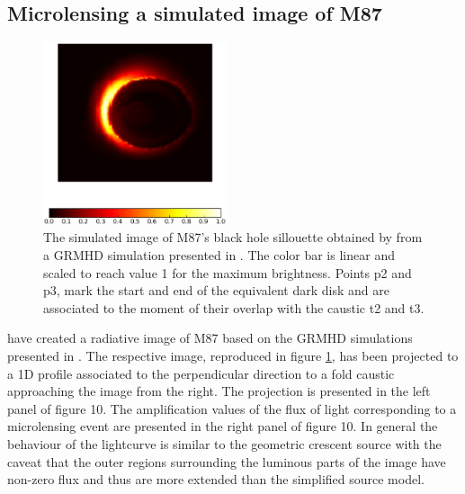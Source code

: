 \subsection{Microlensing a simulated image of M87}

\begin{figure}
\centering
        \includegraphics[width = 0.48\textwidth]{plots/M87_image.eps}
\caption{\label{fig:M87_image} The simulated image of M87's black hole sillouette obtained by \citep{2012MNRAS.421.1517D} from a GRMHD simulation presented in \citep{2009MNRAS.394L.126M}. The color bar is linear and scaled to reach value 1 for the maximum brightness. Points p2 and p3, mark the start and end of the equivalent dark disk and are associated to the moment of their overlap with the caustic t2 and t3.}
\end{figure}


\cite{2012MNRAS.421.1517D} have created a radiative image of M87 based on the GRMHD simulations presented in \citep{2009MNRAS.394L.126M}. The respective image, reproduced in figure \ref{fig:M87_image}, has been projected to a 1D profile associated to the perpendicular direction to a fold caustic approaching the image from the right. The projection is presented in the left panel of figure 10. The amplification values of the flux of light corresponding to a microlensing event are presented in the right panel of figure 10. In general the behaviour of the lightcurve is similar to the geometric crescent source with the caveat that the outer regions surrounding the luminous parts of the image have non-zero flux and thus are more extended than the simplified source model.

